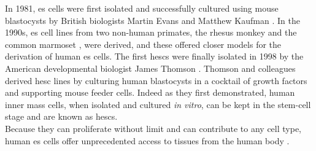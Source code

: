In 1981, \gls{es} cells were first isolated and successfully cultured using mouse blastocysts by British biologists Martin Evans and Matthew Kaufman \cite{evans1981establishment, martin1981isolation}.
In the 1990s, \gls{es} cell lines from two non-human primates, the rhesus monkey \cite{thomson1995isolation} and the common marmoset \cite{thomson1996pluripotent}, were derived, and these offered closer models for the derivation of human \gls{es} cells. 
The first \glspl{hesc} were finally isolated in 1998 by the American developmental biologist James Thomson \cite{thomson1998embryonic}.
Thomson and colleagues derived \gls{hesc} lines by culturing human blastocysts in a cocktail of growth factors and supporting mouse feeder cells.
Indeed as they first demonstrated, human inner mass cells, when isolated and cultured \textit{in vitro}, can be kept in the stem-cell stage and are known as  \glspl{hesc}. \\

Because they can proliferate without limit and can contribute to any cell type, human \gls{es} cells offer unprecedented access to tissues from the human body \cite{department2006regenerative}. 

